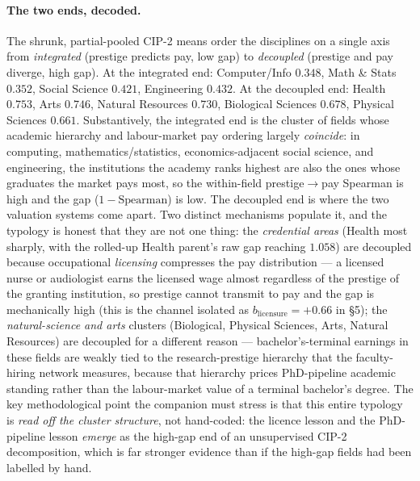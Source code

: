 \documentclass[11pt]{article}
\begin{document}
\paragraph{The two ends, decoded.} The shrunk, partial-pooled CIP-2 means order the disciplines on a single axis from \emph{integrated} (prestige predicts pay, low gap) to \emph{decoupled} (prestige and pay diverge, high gap). At the integrated end: Computer/Info $0.348$, Math \& Stats $0.352$, Social Science $0.421$, Engineering $0.432$. At the decoupled end: Health $0.753$, Arts $0.746$, Natural Resources $0.730$, Biological Sciences $0.678$, Physical Sciences $0.661$. Substantively, the integrated end is the cluster of fields whose academic hierarchy and labour-market pay ordering largely \emph{coincide}: in computing, mathematics/statistics, economics-adjacent social science, and engineering, the institutions the academy ranks highest are also the ones whose graduates the market pays most, so the within-field prestige$\to$pay Spearman is high and the gap ($1-\mathrm{Spearman}$) is low. The decoupled end is where the two valuation systems come apart. Two distinct mechanisms populate it, and the typology is honest that they are not one thing: the \emph{credential areas} (Health most sharply, with the rolled-up Health parent's raw gap reaching $1.058$) are decoupled because occupational \emph{licensing} compresses the pay distribution --- a licensed nurse or audiologist earns the licensed wage almost regardless of the prestige of the granting institution, so prestige cannot transmit to pay and the gap is mechanically high (this is the channel isolated as $b_{\text{licensure}}=+0.66$ in \S5); the \emph{natural-science and arts} clusters (Biological, Physical Sciences, Arts, Natural Resources) are decoupled for a different reason --- bachelor's-terminal earnings in these fields are weakly tied to the research-prestige hierarchy that the faculty-hiring network measures, because that hierarchy prices PhD-pipeline academic standing rather than the labour-market value of a terminal bachelor's degree. The key methodological point the companion must stress is that this entire typology is \emph{read off the cluster structure}, not hand-coded: the licence lesson and the PhD-pipeline lesson \emph{emerge} as the high-gap end of an unsupervised CIP-2 decomposition, which is far stronger evidence than if the high-gap fields had been labelled by hand.
\end{document}
